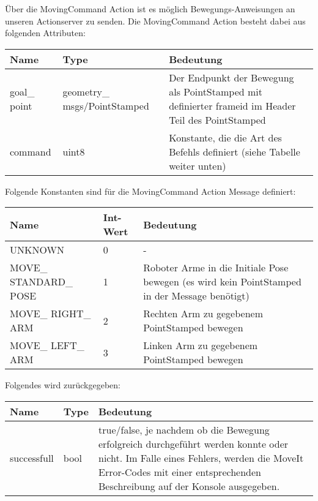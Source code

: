 \documentclass{suturo}
\begin{document}
Über die MovingCommand Action ist es möglich Bewegungs-Anweisungen an unseren Actionserver zu senden. Die MovingCommand Action besteht dabei aus folgenden Attributen:
\begin{center}
	\begin{tabular}{ l | l | p{7cm}}
		Name & Type & Bedeutung \\ \hline
		goal\_ point & geometry\_ msgs/PointStamped & Der Endpunkt der Bewegung als PointStamped mit definierter frameid im Header Teil des PointStamped \\ \hline
		command & uint8 & Konstante, die die Art des Befehls definiert (siehe Tabelle weiter unten) \\
	\end{tabular}
\end{center}
  
Folgende Konstanten sind für die MovingCommand Action Message definiert:

\begin{center}
	\begin{tabular}{ l | l | p{7cm}}
		Name & Int-Wert & Bedeutung \\ \hline
		UNKNOWN & 0 & - \\ \hline
		MOVE\_ STANDARD\_ POSE & 1 & Roboter Arme in die Initiale Pose bewegen (es wird kein PointStamped in der Message benötigt) \\ \hline
		MOVE\_ RIGHT\_ ARM & 2 & Rechten Arm zu gegebenem PointStamped bewegen \\ \hline
		MOVE\_ LEFT\_ ARM & 3 & Linken Arm zu gegebenem PointStamped bewegen \\
	\end{tabular}
\end{center}

Folgendes wird zurückgegeben:


\begin{center}
	\begin{tabular}{ l | l | p{10cm}}
		Name & Type & Bedeutung \\ \hline
		successfull & bool & true/false, je nachdem ob die Bewegung erfolgreich durchgeführt werden konnte oder nicht. Im Falle eines Fehlers, werden die MoveIt Error-Codes mit einer entsprechenden Beschreibung auf der Konsole ausgegeben. \\
	\end{tabular}
\end{center}
\end{document}
